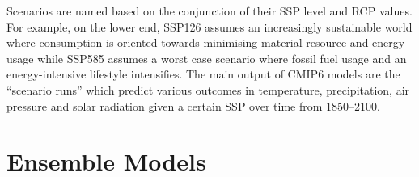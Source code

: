 \documentclass[honours,12pt]{unswthesis}
\numberwithin{equation}{section}
\begin{document}
\begin{table}[ht]
    \centering
    \vspace{1pt}
    \caption{Representative Concentration Pathways}
\end{table}

{\noindent}Scenarios are named based on the conjunction of their SSP level and RCP values. 
For example, on the lower end, SSP126 assumes an increasingly sustainable world where consumption is oriented towards 
minimising material resource and energy usage while SSP585 assumes a worst case scenario where fossil fuel usage and an energy-intensive lifestyle intensifies.
The main output of CMIP6 models are the ``scenario runs'' which predict various outcomes in temperature, precipitation, air pressure and solar radiation given a certain SSP over time from 1850--2100.

{\section{Ensemble Models}}\label{ensemble}
\end{document}
